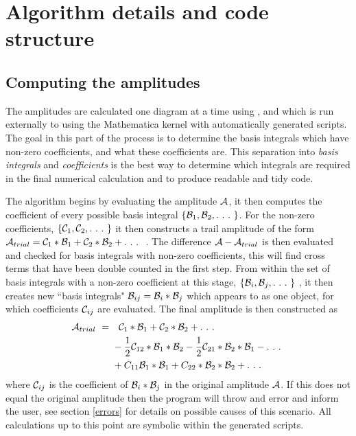 \section{Algorithm details and code structure}

\subsection{Computing the amplitudes}\label{sec:amplitudes}

The amplitudes are calculated one diagram at a time using \feynartss, \feyncalc and \tarcer which is run externally to \CC using the Mathematica kernel with automatically generated scripts.  The goal in this part of the process is to determine the basis integrals which have non-zero coefficients, and what these coefficients are.  This separation into \textit{basis integrals} and \textit{coefficients} is the best way to determine which integrals are required in the final numerical calculation and to produce readable and tidy code.

The algorithm begins by evaluating the amplitude $\mathcal{A}$, it then computes the coefficient of every possible basis integral $\{\B_1,\B_2,.\ .\ .\ \}$.  For the non-zero coefficients, $\{\mathcal{C}_1,\mathcal{C}_2, .\ .\ .\  \}$ it then constructs a trail amplitude of the form $\A_{trial} = \C_1 * \B_1 + \C_2 * \B_2 + .\ .\ .\ $ . The difference $\mathcal{A} - \mathcal{A}_{trial}$ is then evaluated and checked for basis integrals with non-zero coefficients, this will find cross terms that have been double counted in the first step.  From within the set of basis integrals with a non-zero coefficient at this stage, $\{\mathcal{B}_i,\mathcal{B}_j,.\ .\ .\ \}$ , it then creates new ``basis integrals" $\mathcal{B}_{ij} =  \mathcal{B}_i*\mathcal{B}_j$ which appears to \mathematica as one object, for which coefficients $\mathcal{C}_{ij}$ are evaluated.  The final amplitude is then constructed as
\begin{align*}
 \A_{trial}\ = \ & \ \ \C_1 * \B_1 + \C_2 * \B_2 + .\ .\ .\ \\ 
  &-\frac{1}{2} \C_{12} * \B_1*\B_2  -\frac{1}{2} \C_{21} * \B_2*\B_1 - .\ .\ .\ \\
  & + C_{11} \B_1*\B_1 + C_{22}*\B_2*\B_2 + .\ .\ .\ 
\end{align*}
where $ \mathcal{C}_{ij}$ is the coefficient of  $\mathcal{B}_i*\mathcal{B}_j$ in the original amplitude $\mathcal{A}$.  If this does not equal the original amplitude then the program will throw and error and inform the user, see section \ref{errors} for details on possible causes of this scenario.  All calculations up to this point are symbolic within the generated \mathematica scripts.

